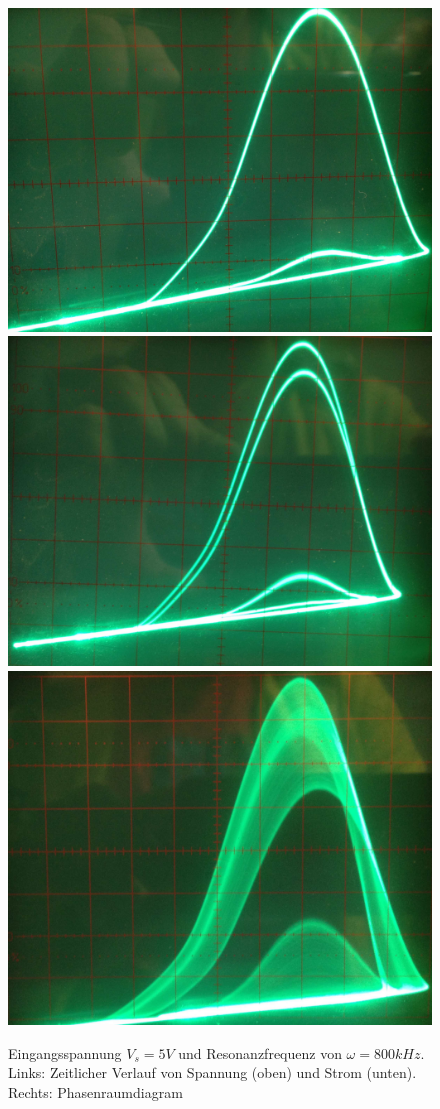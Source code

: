 \documentclass{scrartcl}
\begin{document}
\begin{figure}
\centering
\includegraphics[scale=0.05]{800khz-134V-phase}
\includegraphics[scale=0.055]{800khz-112V-phase}
\includegraphics[scale=0.06]{800khz-29,6V-phase-chaos}
\caption{Eingangsspannung $V_s=5V$ und Resonanzfrequenz von $\omega=800kHz$. Links: Zeitlicher Verlauf von Spannung (oben) und Strom (unten). Rechts: Phasenraumdiagram}
\label{fig:ldr-real2}
\end{figure}
\end{document}
